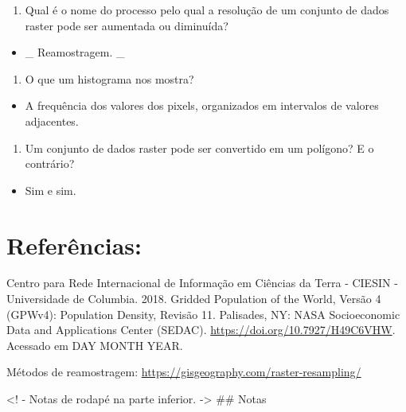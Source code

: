 \documentclass[
]{book}
\providecommand{\tightlist}{%
  \setlength{\itemsep}{0pt}\setlength{\parskip}{0pt}}
\begin{document}
\begin{enumerate}
\def\labelenumi{\arabic{enumi}.}
\tightlist
\item
  Qual é o nome do processo pelo qual a resolução de um conjunto de dados raster pode ser aumentada ou diminuída?
\end{enumerate}

\begin{itemize}
\tightlist
\item
  \_ { Reamostragem. } \_
\end{itemize}

\begin{enumerate}
\def\labelenumi{\arabic{enumi}.}
\setcounter{enumi}{1}
\tightlist
\item
  O que um histograma nos mostra?
\end{enumerate}

\begin{itemize}
\tightlist
\item
  { A frequência dos valores dos pixels, organizados em intervalos de valores adjacentes. }
\end{itemize}

\begin{enumerate}
\def\labelenumi{\arabic{enumi}.}
\setcounter{enumi}{2}
\tightlist
\item
  Um conjunto de dados raster pode ser convertido em um polígono? E o contrário?
\end{enumerate}

\begin{itemize}
\tightlist
\item
  { Sim e sim. }
\end{itemize}

\hypertarget{referuxeancias}{%
\section{Referências:}\label{referuxeancias}}

Centro para Rede Internacional de Informação em Ciências da Terra - CIESIN - Universidade de Columbia. 2018. Gridded Population of the World, Versão 4 (GPWv4): Population Density, Revisão 11. Palisades, NY: NASA Socioeconomic Data and Applications Center (SEDAC). \url{https://doi.org/10.7927/H49C6VHW}. Acessado em DAY MONTH YEAR.

Métodos de reamostragem: \url{https://gisgeography.com/raster-resampling/}

\textless! - Notas de rodapé na parte inferior. -\textgreater{}
\#\# Notas
\end{document}
